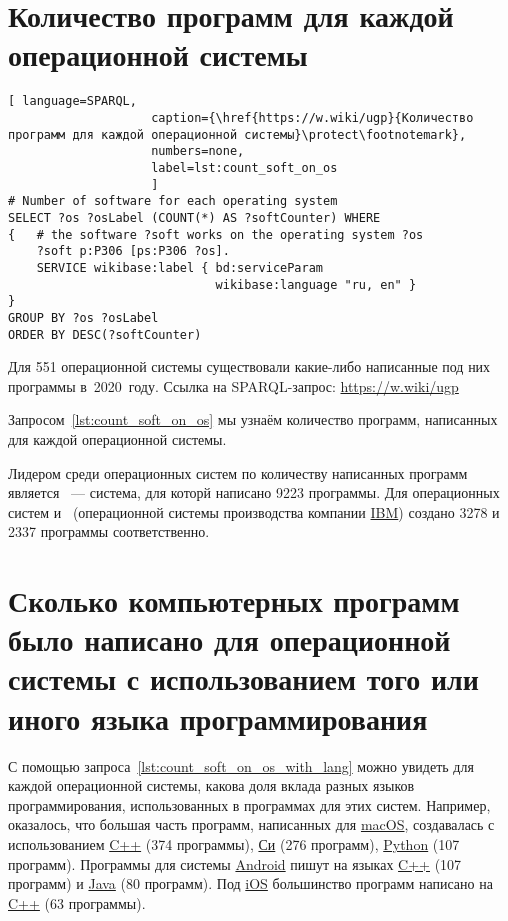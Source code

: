 \newpage
\section{Количество программ для каждой операционной системы}
%
\begin{marginfigure}[-3\baselineskip]
\begin{lstlisting}[ language=SPARQL, 
                    caption={\href{https://w.wiki/ugp}{Количество программ для каждой операционной системы}\protect\footnotemark},
                    numbers=none,
                    label=lst:count_soft_on_os
                    ]
# Number of software for each operating system
SELECT ?os ?osLabel (COUNT(*) AS ?softCounter) WHERE
{   # the software ?soft works on the operating system ?os
    ?soft p:P306 [ps:P306 ?os].
    SERVICE wikibase:label { bd:serviceParam 
                             wikibase:language "ru, en" }
}
GROUP BY ?os ?osLabel
ORDER BY DESC(?softCounter)
\end{lstlisting}
Для \num{551} операционной системы существовали какие-либо написанные под них программы в~2020~году. 
    Ссылка на SPARQL-запрос: \href{https://w.wiki/ugp}{https://w.wiki/ugp}
\end{marginfigure}


Запросом~\ref{lst:count_soft_on_os} мы узнаём количество программ, 
написанных для каждой операционной системы.

Лидером среди операционных систем по количеству написанных программ 
    является ~--- система, для которй написано \num{9223} программы. 
    Для операционных систем  и~ 
    (операционной системы производства компании \href{https://www.wikidata.org/wiki/Q37156}{IBM}) 
    создано \num{3278} и \num{2337} программы соответственно.





\section{Сколько компьютерных программ было написано для операционной системы с использованием того или иного языка программирования}

С помощью запроса~\ref{lst:count_soft_on_os_with_lang} можно увидеть для каждой операционной системы, 
какова доля вклада разных языков программирования, использованных в программах для этих систем. 
Например, оказалось, что большая часть программ, 
написанных для \href{https://www.wikidata.org/wiki/Q14116}{macOS}, 
создавалась с использованием \href{https://www.wikidata.org/wiki/Q2407}{C++} (374 программы), 
\href{https://www.wikidata.org/wiki/Q15777}{Си} (276 программ), 
\href{https://www.wikidata.org/wiki/Q28865}{Python} (107 программ).
Программы для системы \href{https://www.wikidata.org/wiki/Q94}{Android} пишут 
на языках \href{https://www.wikidata.org/wiki/Q2407}{C++} (107 программ) 
и \href{https://www.wikidata.org/wiki/Q251}{Java} (80 программ).
Под \href{https://www.wikidata.org/wiki/Q48493}{iOS} большинство программ 
написано на \href{https://www.wikidata.org/wiki/Q2407}{C++} (63 программы).

